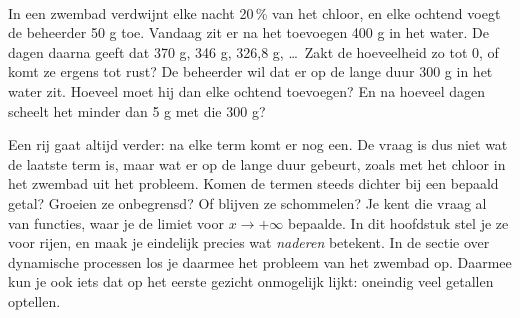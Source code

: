 %

﻿

\begin{probleem}
In een zwembad verdwijnt elke nacht 20\,\% van het chloor, en elke ochtend voegt de beheerder 50 g toe. Vandaag zit er na het toevoegen 400 g in het water. De dagen daarna geeft dat 370 g, 346 g, 326,8 g, \ldots\ Zakt de hoeveelheid zo tot 0, of komt ze ergens tot rust? De beheerder wil dat er op de lange duur 300 g in het water zit. Hoeveel moet hij dan elke ochtend toevoegen? En na hoeveel dagen scheelt het minder dan 5 g met die 300 g?
\end{probleem}


Een rij gaat altijd verder: na elke term komt er nog een. De vraag is dus niet wat de laatste term is, maar wat er op de lange duur gebeurt, zoals met het chloor in het zwembad uit het probleem. Komen de termen steeds dichter bij een bepaald getal? Groeien ze onbegrensd? Of blijven ze schommelen? Je kent die vraag al van functies, waar je de limiet voor $x \to +\infty$ bepaalde. In dit hoofdstuk stel je ze voor rijen, en maak je eindelijk precies wat \textit{naderen} betekent. In de sectie over dynamische processen los je daarmee het probleem van het zwembad op. Daarmee kun je ook iets dat op het eerste gezicht onmogelijk lijkt: oneindig veel getallen optellen.

\begin{oefeningen}[Start]

\end{oefeningen}

